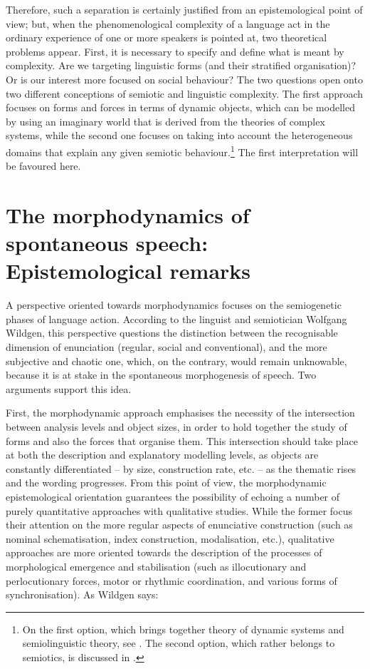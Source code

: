 \documentclass[output=paper]{langscibook}
\begin{document}
\begin{sloppypar}
Therefore, such a separation is certainly justified from an epistemological point of view; but, when the phenomenological complexity of a language act in the ordinary experience of one or more speakers is pointed at, two theoretical problems appear. First, it is necessary to specify and define what is meant by complexity. Are we targeting linguistic forms (and their stratified organisation)? Or is our interest more focused on social behaviour? The two questions open onto two different conceptions of semiotic and linguistic complexity. The first approach focuses on forms and forces in terms of dynamic objects, which can be modelled by using an imaginary world that is derived from the theories of complex systems, while the second one focuses on taking into account the heterogeneous domains that explain any given semiotic behaviour.\footnote{On the first option, which brings together theory of dynamic systems and semiolinguistic theory, see \citet{Bondi2015,Bondi2017,Piotrowski2018}. The second option, which rather belongs to semiotics, is discussed in \citet{BassoFossali2017}.} The first interpretation will be favoured here.
\end{sloppypar}

\section{The morphodynamics of spontaneous speech: Epistemological remarks} 

A perspective oriented towards morphodynamics focuses on the semiogenetic phases of language action. According to the linguist and semiotician Wolfgang Wildgen, this perspective questions the distinction between the recognisable dimension of enunciation (regular, social and conventional), and the more subjective and chaotic one, which, on the contrary, would remain unknowable, because it is at stake in the spontaneous morphogenesis of speech. Two arguments support this idea. 

First, the morphodynamic approach emphasises the necessity of the intersection between analysis levels and object sizes, in order to hold together the study of forms and also the forces that organise them. This intersection should take place at both the description and explanatory modelling levels, as objects are constantly differentiated – by size, construction rate, etc. – as the thematic rises and the wording progresses. From this point of view, the morphodynamic epistemological orientation guarantees the possibility of echoing a number of purely quantitative approaches with qualitative studies. While the former focus their attention on the more regular aspects of enunciative construction (such as nominal schematisation, index construction, modalisation, etc.), qualitative approaches are more oriented towards the description of the processes of morphological emergence and stabilisation (such as illocutionary and perlocutionary forces, motor or rhythmic coordination, and various forms of synchronisation). As Wildgen says:
\end{document}
